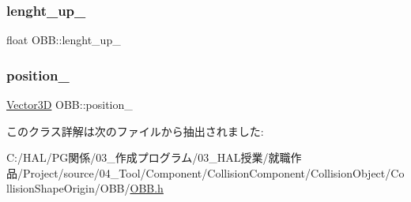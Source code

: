 \mbox{\label{class_o_b_b_a4c7f9246708424221b38051cc763ca3c}} 
\subsubsection{\texorpdfstring{lenght\+\_\+up\+\_\+}{lenght\_up\_}}
{\footnotesize\ttfamily float O\+B\+B\+::lenght\+\_\+up\+\_\+}

\mbox{\label{class_o_b_b_ab05a884fc030d7a3cf7b355880d9194c}} 
\subsubsection{\texorpdfstring{position\+\_\+}{position\_}}
{\footnotesize\ttfamily \mbox{\hyperlink{class_vector3_d}{Vector3D}} O\+B\+B\+::position\+\_\+}



このクラス詳解は次のファイルから抽出されました\+:\begin{DoxyCompactItemize}
\item 
C\+:/\+H\+A\+L/\+P\+G関係/03\+\_\+作成プログラム/03\+\_\+\+H\+A\+L授業/就職作品/\+Project/source/04\+\_\+\+Tool/\+Component/\+Collision\+Component/\+Collision\+Object/\+Collision\+Shape\+Origin/\+O\+B\+B/\mbox{\hyperlink{_o_b_b_8h}{O\+B\+B.\+h}}\end{DoxyCompactItemize}
